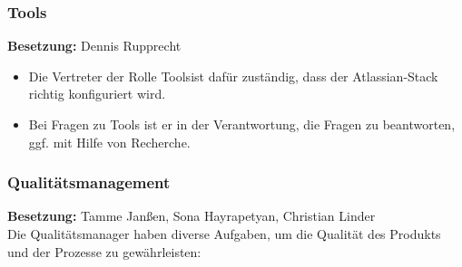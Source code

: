 \subsubsection{Tools}
\textbf{Besetzung:} Dennis Rupprecht \\
\begin{itemize}
	\item Die Vertreter der Rolle \dq Tools\dq  ist dafür zuständig, dass der Atlassian-Stack richtig konfiguriert wird.
	\item Bei Fragen zu Tools ist er in der Verantwortung, die Fragen zu beantworten, ggf. mit Hilfe von Recherche.
\end{itemize}

\subsubsection{Qualitätsmanagement}
\textbf{Besetzung:} Tamme Janßen, Sona Hayrapetyan, Christian Linder \\
Die Qualitätsmanager haben diverse Aufgaben, um die Qualität des Produkts und der Prozesse zu gewährleisten:
